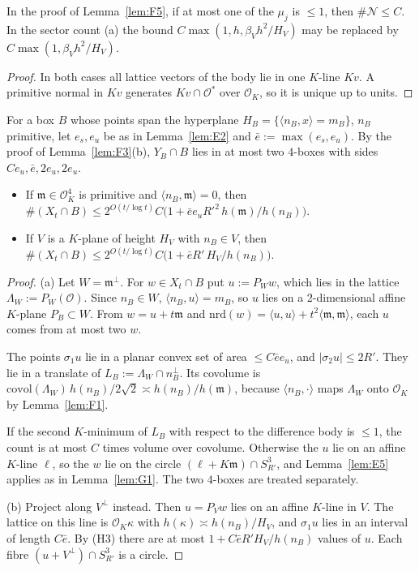 \begin{lemma}\label{lem:G2}
In the proof of Lemma~\ref{lem:F5}, if at most one of the $\mu_j$ is $\le1$, then $\#\mathcal N\le C$. In the
sector count (a) the bound $C\max(1,h,\beta_Vh^2/H_V)$ may be replaced by $C\max(1,\beta_Vh^2/H_V)$.
\end{lemma}
\begin{proof}
In both cases all lattice vectors of the body lie in one $K$-line $Kv$. A primitive normal in $Kv$
generates $Kv\cap\mathcal O^*$ over $\mathcal O_K$, so it is unique up to units.
\end{proof}

For a box $B$ whose points span the hyperplane $H_B=\{\langle n_B,x\rangle=m_B\}$, $n_B$ primitive, let
$e_s,e_u$ be as in Lemma~\ref{lem:E2} and $\bar e:=\max(e_s,e_u)$. By the proof of
Lemma~\ref{lem:F3}(b), $Y_B\cap B$ lies in at most two $4$-boxes with sides $Ce_u,\bar e,2e_u,2e_u$.

\begin{lemma}[Projections]\label{lem:G3}
\begin{itemize}\setlength\itemsep{0pt}
\item[(a)] If $\mathfrak m\in\mathcal O_K^4$ is primitive and $\langle n_B,\mathfrak m\rangle=0$, then
$\#(X_t\cap B)\le2^{O(t/\log t)}C\big(1+\bar ee_uR'^2\,h(\mathfrak m)/h(n_B)\big)$.
\item[(b)] If $V$ is a $K$-plane of height $H_V$ with $n_B\in V$, then
$\#(X_t\cap B)\le2^{O(t/\log t)}C\big(1+\bar eR'\,H_V/h(n_B)\big)$.
\end{itemize}
\end{lemma}
\begin{proof}
(a) Let $W=\mathfrak m^\perp$. For $w\in X_t\cap B$ put $u:=P_Ww$, which lies in the lattice
$\Lambda_W:=P_W(\mathcal O)$. Since $n_B\in W$, $\langle n_B,u\rangle=m_B$, so $u$ lies on a $2$-dimensional affine
$K$-plane $P_B\subset W$. From $w=u+t\mathfrak m$ and
$\mathrm{nrd}(w)=\langle u,u\rangle+t^2\langle\mathfrak m,\mathfrak m\rangle$, each $u$ comes from at most two $w$.

The points $\sigma_1u$ lie in a planar convex set of area $\le C\bar ee_u$, and $|\sigma_2u|\le2R'$. They lie in
a translate of $L_B:=\Lambda_W\cap n_B^\perp$. Its covolume is
$\mathrm{covol}(\Lambda_W)\,h(n_B)/2\sqrt2\asymp h(n_B)/h(\mathfrak m)$, because
$\langle n_B,\cdot\rangle$ maps $\Lambda_W$ onto $\mathcal O_K$ by Lemma~\ref{lem:F1}.

If the second $K$-minimum of $L_B$ with respect to the difference body is $\le1$, the count is at most $C$
times volume over covolume. Otherwise the $u$ lie on an affine $K$-line $\ell$, so the $w$ lie on the circle
$(\ell+K\mathfrak m)\cap S^3_{R'}$, and Lemma~\ref{lem:E5} applies as in Lemma~\ref{lem:G1}. The two
$4$-boxes are treated separately.

(b) Project along $V^\perp$ instead. Then $u=P_Vw$ lies on an affine $K$-line in $V$. The lattice on this
line is $\mathcal O_K\kappa$ with $h(\kappa)\asymp h(n_B)/H_V$, and $\sigma_1u$ lies in an interval of length
$C\bar e$. By (H3) there are at most $1+C\bar eR'H_V/h(n_B)$ values of $u$. Each fibre $(u+V^\perp)\cap S^3_{R'}$
is a circle.
\end{proof}

